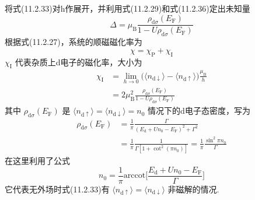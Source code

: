 将式(11.2.33)对h作展开，并利用式(11.2.29)和式(11.2.36)定出未知量
\begin{equation}
  \Delta=\mu_{\mathrm{B}}
  \frac{\rho_{\mathrm{d}\sigma}(E_{\mathrm{F}})}
  {1-U\rho_{\mathrm{d}\sigma}(E_{\mathrm{F}})}
\end{equation}
根据式(11.2.27)，系统的顺磁磁化率为
\begin{equation*}
  \chi=\chi_{\mathrm{P}}+\chi_{\mathrm{I}}
\end{equation*}
$\chi_{\mathrm{I}}$ 代表杂质上d电子的磁化率，大小为
\begin{equation}
\begin{aligned}
  \chi_{\mathrm{I}}
  &=\lim_{h\to0}\bigl(\langle n_{\mathrm{d}\downarrow}\rangle
  -\langle n_{\mathrm{d}\uparrow}\rangle\bigr)\frac{\mu_{\mathrm{B}}}{h}\\
  &=2\mu^{2}_{\mathrm{B}}
  \frac{\rho_{\mathrm{d}\sigma}(E_{\mathrm{F}})}
  {1-U\rho_{\mathrm{d}\sigma}(E_{\mathrm{F}})}
\end{aligned}
\end{equation}
其中 $\rho_{\mathrm{d}\sigma}(E_{\mathrm{F}})$ 是 $\langle n_{\mathrm{d}\uparrow}\rangle=\langle n_{\mathrm{d}\downarrow}\rangle=n_{0}$ 情况下的d电子态密度，写为
\begin{equation}
\begin{aligned}
  \rho_{\mathrm{d}\sigma}(E_{\mathrm{F}})
  &=\frac{1}{\pi}
  \frac{\Gamma}{(E_{\mathrm{d}}+Un_{0}-E_{\mathrm{F}})^{2}+\Gamma^{2}}\\
  &=\frac{1}{\pi}\frac{1}{\Gamma[1+\cot^{2}(\pi n_{0})]}
  =\frac{1}{\pi}\frac{\sin^{2}\pi n_{0}}{\Gamma}
\end{aligned}
\end{equation}
在这里利用了公式
\begin{equation}
  n_{0}=\frac{1}{\pi}\mathrm{arccot}
  \biggl[\frac{E_{\mathrm{d}}+Un_{0}-E_{\mathrm{F}}}{\Gamma}\biggr]
\end{equation}
它代表无外场时式(11.2.33)有 $\langle n_{\mathrm{d}\uparrow}\rangle=\langle n_{\mathrm{d}\downarrow}\rangle$ 非磁解的情况.

